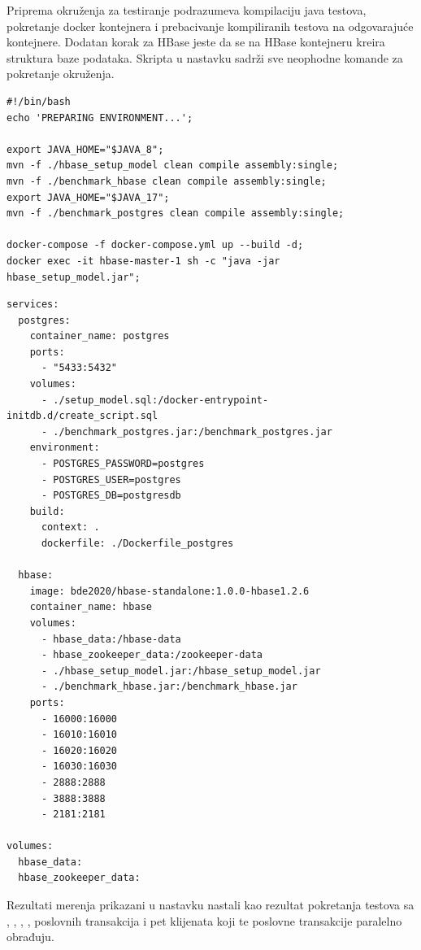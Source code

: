\documentclass[12pt,oneside]{memoir}
\begin{document}
Priprema okruženja za testiranje podrazumeva kompilaciju java testova, pokretanje docker kontejnera i prebacivanje kompiliranih testova na odgovarajuće kontejnere. Dodatan korak za HBase jeste da se na HBase kontejneru kreira struktura baze podataka. Skripta u nastavku sadrži sve neophodne komande za pokretanje okruženja.

\pagebreak

\begin{lstlisting}[title={prepare-env.sh - Skripta za pokretanje OLTP okruženja},captionpos=b]
#!/bin/bash
echo 'PREPARING ENVIRONMENT...';

export JAVA_HOME="$JAVA_8";
mvn -f ./hbase_setup_model clean compile assembly:single;
mvn -f ./benchmark_hbase clean compile assembly:single;
export JAVA_HOME="$JAVA_17";
mvn -f ./benchmark_postgres clean compile assembly:single;

docker-compose -f docker-compose.yml up --build -d;
docker exec -it hbase-master-1 sh -c "java -jar hbase_setup_model.jar";
\end{lstlisting}

\begin{lstlisting}[title={docker-compose.yml - Definicija kontejnera za OLTP okruženje},captionpos=b]
services: 
  postgres:
    container_name: postgres
    ports:
      - "5433:5432"
    volumes:
      - ./setup_model.sql:/docker-entrypoint-initdb.d/create_script.sql
      - ./benchmark_postgres.jar:/benchmark_postgres.jar
    environment:
      - POSTGRES_PASSWORD=postgres
      - POSTGRES_USER=postgres
      - POSTGRES_DB=postgresdb
    build:
      context: .
      dockerfile: ./Dockerfile_postgres

  hbase:
    image: bde2020/hbase-standalone:1.0.0-hbase1.2.6
    container_name: hbase
    volumes:
      - hbase_data:/hbase-data
      - hbase_zookeeper_data:/zookeeper-data
      - ./hbase_setup_model.jar:/hbase_setup_model.jar
      - ./benchmark_hbase.jar:/benchmark_hbase.jar
    ports:
      - 16000:16000
      - 16010:16010
      - 16020:16020
      - 16030:16030
      - 2888:2888
      - 3888:3888
      - 2181:2181

volumes:
  hbase_data:
  hbase_zookeeper_data:
\end{lstlisting}

Rezultati merenja prikazani u nastavku nastali kao rezultat pokretanja testova sa , , , ,  poslovnih transakcija i pet klijenata koji te poslovne transakcije paralelno obrađuju.
\end{document}
